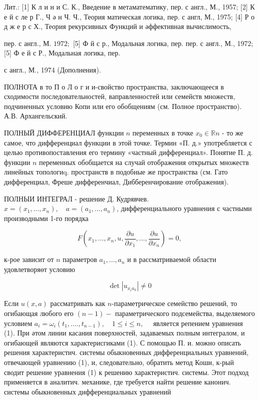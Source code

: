 \documentclass[10pt]{article}
\begin{document}
Лит.: [1] К л и н и С. К., Введение в метаматематику, пер. с англ., М., 1957; [2] К е й с ле р Г., Ч ә н Ч. Ч., Теория матическая логика, пер. с англ, М., 1975; [4] Р о д ж е р с Х., Теория рекурсивных Функций и әффективная вычислимость,

пер. с англ., М. $1972 ;$ [5] Ф й с р., Модальная логика, пер. пер. с англ., М., 1972; [5] Ф е й с Р., Модальная логика, пер.

с англ., М., 1974 (Дополнения).



ПОЛНОТА в то П о Л о г и и-свойство пространства, заключающееся в сходимости последовательностей, ваправленностей или семейств множеств, подчиненных условию Копи или его обобщениям (см. Полное пространство). А.В. Архангельский.



ПОЛНЫЙ ДИФФЕРЕНЦИАЛ функции $n$ переменных в точке $x_{0} \in \mathbb{R} n$ - то же самое, что дифференциал функции в этой точке. Термин «П. д.» употребляется с целью противопоставления его термину «частный дифференциал». Понятие П. д. функции $n$ переменных обобщается на случай отображения открытых множеств линейных топологиq. пространств в подобные же пространства (см. Гато дифференциал, Фреше дифференчиал, Дибберенчирование отображения).



ПОЛНЫИ ИНТЕГРАЛ - решение Д. Кудрявчев. $x=\left(x_{1}, \ldots, x_{n}\right), \quad a=\left(a_{1}, \ldots, a_{n}\right)$, дифференциального уравнения с частными производными 1-го порядка



\[

F\left(x_{1}, \ldots, x_{n}, u, \frac{\partial u}{\partial x_{1}}, \ldots, \frac{\partial u}{\partial x_{n}}\right)=0,

\]



к-рое зависит от $n$ параметров $a_{1}, \ldots, a_{n}$ и в рассматриваемой области удовлетворяөт условию



\[

\operatorname{det}\left|u_{x_{i} a_{k}}\right| \neq 0

\]



Если $u(x, a)$ рассматривать как $n$-параметрическое семейство решений, то огибающая любого его $(n-1)-$ параметрического подсемейства, выделяемого условием $a_{i}=\omega_{i}\left(t_{1}, \ldots ., t_{n-1}\right), \quad 1 \leqslant i \leqslant n, \quad$ является репением уравнения (1). При әтом линии касания поверхностей, задаваемых полным интегралом, и огибающей являются характерисгиками (1). С помощью П. и. можно описать решения характеристич. системы обыкновенных дифференциальных уравнений, отвечающей уравнению (1), и, следовательно, обратить метод Коши, к-рый сводит решение уравнения (1) к решению характеристич. системы. Этот подход применяется в аналитич. механике, где требуется найти решение канонич. системы обыкновенных дифференциальных уравнений
\end{document}
